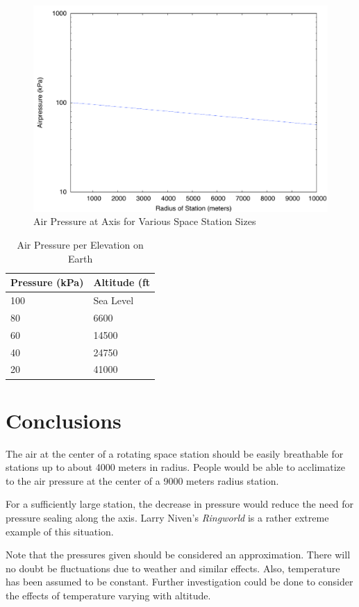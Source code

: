 \documentclass[10pt, openany]{article}
\begin{document}
\begin{figure}[!ht] 
  \centering
  \includegraphics[scale=0.7]{fig2.pdf}
  \vspace{1ex}
  \caption{Air Pressure at Axis for Various Space Station Sizes}
  \label{fig:PressAxis}
\end{figure}

\begin{table}[ht]
\centering
\caption{Air Pressure per Elevation on Earth}
\vspace{1ex}
\label{tbl:AirPress}
\begin{tabular}{|l|l|}
\hline
Pressure (kPa) & Altitude (ft\\ \hline
100 & Sea Level\\ \hline
80 & 6600\\ \hline
60 & 14500\\ \hline
40 & 24750\\ \hline
20 & 41000\\ \hline
\end{tabular}
\end{table}

\section{Conclusions}
The air at the center of a rotating space station should be easily breathable for stations up to about 4000 meters in radius.  People would be able to acclimatize to the air pressure at the center of a 9000 meters radius station.

For a sufficiently large station, the decrease in pressure would reduce the need for pressure sealing along the axis.  Larry Niven's \emph{Ringworld}\cite{Niven:1977rz} is a rather extreme example of this situation.

Note that the pressures given should be considered an approximation.  There will no doubt be fluctuations due to weather and similar effects.  Also, temperature has been assumed to be constant.  Further investigation could be done to consider the effects of temperature varying with altitude.
%
%
\clearpage


\end{document}
